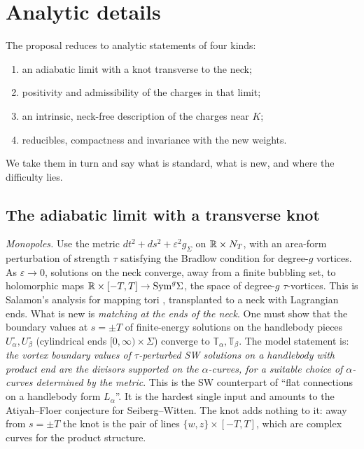 \section{Analytic details}\label{sec:analysis}
The proposal reduces to analytic statements of four kinds:
\begin{enumerate}[label=(\alph*)]
\item an adiabatic limit with a knot transverse to the neck;
\item positivity and admissibility of the charges in that limit;
\item an intrinsic, neck-free description of the charges near $K$;
\item reducibles, compactness and invariance with the new weights.
\end{enumerate}
We take them in turn and say what is standard, what is new, and where the difficulty lies.

\subsection{The adiabatic limit with a transverse knot}
\emph{Monopoles.}  Use the metric $dt^2+ds^2+\varepsilon^2g_\Sigma$ on $\mathbb{R}\times N_T$, with an area-form perturbation of strength
$\tau$ satisfying the Bradlow condition for degree-$g$ vortices.  As $\varepsilon\to0$, solutions on the neck converge, away from
a finite bubbling set, to holomorphic maps $\mathbb{R}\times[-T,T]\to\mathrm{Sym}^g\Sigma$, the space of degree-$g$ $\tau$-vortices.  This is
Salamon's analysis for mapping tori \cite{Salamon-SW}, transplanted to a neck with Lagrangian ends.  What is new is
\emph{matching at the ends of the neck}.  One must show that the boundary values at $s=\pm T$ of finite-energy solutions
on the handlebody pieces $U_\alpha^\circ,U_\beta^\circ$ (cylindrical ends $[0,\infty)\times\Sigma$) converge to $\mathbb T_\alpha,\mathbb T_\beta$.  The model
statement is: \emph{the vortex boundary values of $\tau$-perturbed SW solutions on a handlebody with product end are the
divisors supported on the $\alpha$-curves, for a suitable choice of $\alpha$-curves determined by the metric}.  This is
the SW counterpart of ``flat connections on a handlebody form $L_\alpha$''.  It is the hardest single input and amounts
to the Atiyah--Floer conjecture for Seiberg--Witten.  The knot adds nothing to it: away from $s=\pm T$ the knot is the
pair of lines $\{w,z\}\times[-T,T]$, which are complex curves for the product structure.

